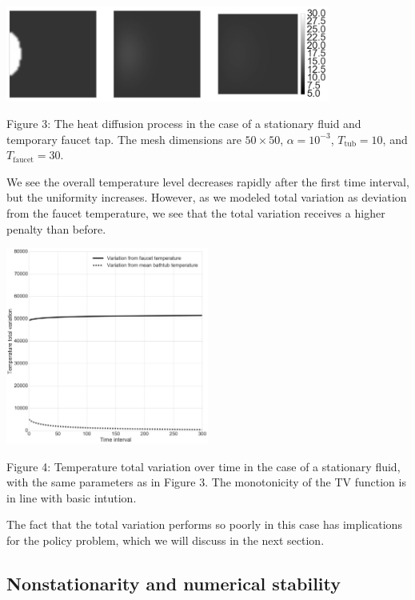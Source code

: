 \documentclass[12pt]{amsart}
\begin{document}
\begin{center}
    \includegraphics[width=0.8\textwidth]{../plots/diffusion-02.png}

    \justify
    \footnotesize{
    Figure 3: The heat diffusion process in the case of a stationary fluid and
    temporary faucet tap. The mesh dimensions are $50 \times 50$, $\alpha =
    10^{-3}$, $T_{\mathrm{tub}} = 10$, and $T_{\mathrm{faucet}} = 30$.}
\end{center}

We see the overall temperature level decreases rapidly after the first time
interval, but the uniformity increases.  However, as we modeled total variation
as deviation from the faucet temperature, we see that the total variation
receives a higher penalty than before.

\begin{center}
    \includegraphics[width=0.5\textwidth]{../plots/tv-02.png}

    \justify
    \footnotesize{
    Figure 4: Temperature total variation over time in the case of a stationary
    fluid, with the same parameters as in Figure 3. The monotonicity of the TV
function is in line with basic intution.}
\end{center}
The fact that the total variation performs so poorly in this case has
implications for the policy problem, which we will discuss in the next section.

\subsection{Nonstationarity and numerical stability}
\end{document}
